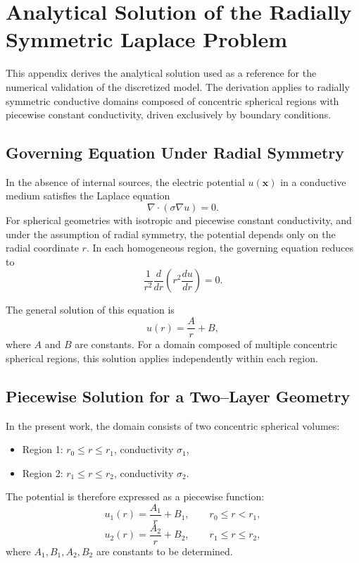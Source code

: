 \section{Analytical Solution of the Radially Symmetric Laplace Problem}
\label{appendix:laplace-r}

This appendix derives the analytical solution used as a reference for the numerical validation of the discretized model. The derivation applies to radially symmetric conductive domains composed of concentric spherical regions with piecewise constant conductivity, driven exclusively by boundary conditions.

\subsection{Governing Equation Under Radial Symmetry}

In the absence of internal sources, the electric potential $u(\mathbf{x})$ in a conductive medium satisfies the Laplace equation
\[
\nabla \cdot (\sigma \nabla u) = 0.
\]
For spherical geometries with isotropic and piecewise constant conductivity, and under the assumption of radial symmetry, the potential depends only on the radial coordinate $r$. In each homogeneous region, the governing equation reduces to
\[
\frac{1}{r^2}\frac{d}{dr}\left(r^2 \frac{du}{dr}\right) = 0.
\]

The general solution of this equation is
\[
u(r) = \frac{A}{r} + B,
\]
where $A$ and $B$ are constants. For a domain composed of multiple concentric spherical regions, this solution applies independently within each region.

\subsection{Piecewise Solution for a Two--Layer Geometry}

In the present work, the domain consists of two concentric spherical volumes:
\begin{itemize}
    \item Region 1: $r_0 \le r \le r_1$, conductivity $\sigma_1$,
    \item Region 2: $r_1 \le r \le r_2$, conductivity $\sigma_2$.
\end{itemize}

The potential is therefore expressed as a piecewise function:
\[
u_1(r) = \frac{A_1}{r} + B_1, \qquad r_0 \le r < r_1,
\]
\[
u_2(r) = \frac{A_2}{r} + B_2, \qquad r_1 \le r \le r_2,
\]
where $A_1, B_1, A_2, B_2$ are constants to be determined.

